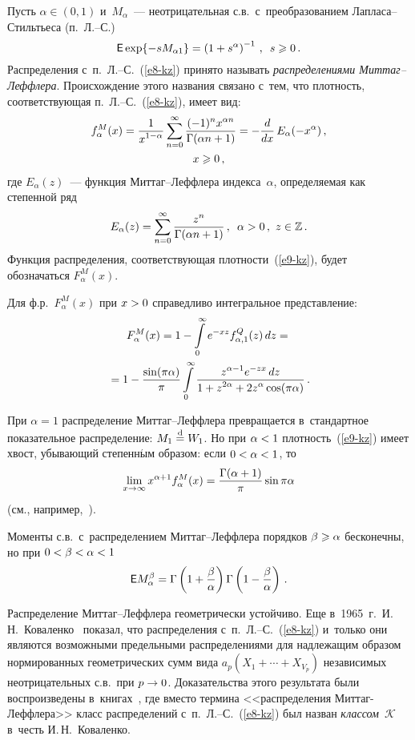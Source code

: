 \begin{multicols}{2}
Пусть $\alpha\in(0,1)$ и~$M_{\alpha}$~--- неотрицательная с.в.\
с~преобразованием Лап\-ла\-са--Стиль\-тье\-са (п.~Л.--С.)
\begin{equation}
{\sf E}\exp\{-sM_{\alpha1}\}=\left(1+s^{\alpha}\right)^{-1}\,,\enskip
s\geqslant0\,.\label{e8-kz}
\end{equation}
Распределения с~п.~Л.--С.~(\ref{e8-kz}) принято называть \textit{распределениями
Мит\-таг--Леф\-фле\-ра}. Происхождение этого названия связано с~тем, что
плотность, соответствующая п.~Л.--С.~(\ref{e8-kz}), имеет вид:
\begin{multline}
f_{\alpha}^{M}(x)=\displaystyle\frac{\displaystyle 1\mathstrut}{\displaystyle x^{1-\alpha}\mathstrut}\sum\limits_{n=0}^{\infty}
\displaystyle\frac{\displaystyle (-1)^nx^{\alpha n}\mathstrut}{\displaystyle \Gamma(\alpha n+1)\mathstrut}=-\displaystyle\frac{\displaystyle d\mathstrut}{\displaystyle dx\mathstrut}\,E_{\alpha}(-x^{\alpha})\,,\\
x\geqslant0\,,\label{e9-kz}
\end{multline}
где $E_{\alpha}(z)$~--- функция Мит\-таг--Леф\-фле\-ра индекса~$\alpha$,
определяемая как степенной ряд
$$
E_{\alpha}(z)=\sum\limits_{n=0}^{\infty}\displaystyle\frac{\displaystyle z^n\mathstrut}{\displaystyle \Gamma(\alpha
n+1)\mathstrut}\,,\enskip \alpha>0\,,\ z\in\mathbb{Z}\,.
$$
Функция распределения, соответствующая плотности~(\ref{e9-kz}), будет обозначаться
$F_{\alpha}^{M}(x)$.

Для ф.р.~$F_{\alpha}^{M}(x)$ при $x\hm>0$ справедливо интегральное
представление:
\begin{multline}
F_{\alpha}^{M}(x)=1-\int\limits_{0}^{\infty}e^{-xz}f_{\alpha,1}^{Q}(z)\,dz={}\\
{}=
1-\displaystyle\frac{\displaystyle \sin(\pi\alpha)\mathstrut}{\displaystyle \pi\mathstrut}\int\limits_{0}^{\infty}
\displaystyle\frac{\displaystyle z^{\alpha-1}e^{-zx}\,dz\mathstrut}{\displaystyle 1+z^{2\alpha}+2z^{\alpha}\cos(\pi\alpha)\mathstrut}\,.
\label{e10-kz}
\end{multline}

При $\alpha=1$ распределение Мит\-таг--Леф\-фле\-ра превращается 
в~стандартное показательное распределение: $M_1\stackrel{\mathrm{d}}{=} W_1$. Но при
$\alpha\hm<1$ плотность~(\ref{e9-kz}) имеет хвост, убывающий степенн$\acute{\mbox{ы}}$м
образом: если $0\hm<\alpha\hm<1$, то
$$
\lim\limits_{x\to\infty}x^{\alpha+1}f_\alpha^{M}(x)=
\displaystyle\frac{\displaystyle \Gamma(\alpha+1)\mathstrut}{\displaystyle \pi\mathstrut}\sin\pi\alpha
$$
(см., например,~\cite{Kilbas2014}).

Моменты с.в.\ с~распределением Мит\-таг--Леф\-фле\-ра порядков
$\beta\hm\geqslant\alpha$ бесконечны, но при $0\hm<\beta\hm<\alpha\hm<1$
$$
{\sf E}M_{\alpha}^{\beta}=
\Gamma\left(1+\displaystyle\frac{\displaystyle \beta\mathstrut}{\displaystyle \alpha\mathstrut}\right)\Gamma\left(1-\displaystyle\frac{\displaystyle \beta\mathstrut}{\displaystyle \alpha\mathstrut}\right)\,.
$$

Распределение Мит\-таг--Леф\-фле\-ра геометрически устойчиво. Еще в~1965~г.\
И.\,Н.~Коваленко~\cite{Kovalenko1965} показал, что распределения с~п.~Л.--С.~(\ref{e8-kz}) 
и~только они являются возможными предельными
распределениями для надлежащим образом нормированных геометрических
сумм вида $a_p(X_1+\cdots+X_{V_p})$ независимых
неотрицательных с.в.\ при $p\hm\to0$. Доказательства этого результата
были воспроизведены в~книгах~\cite{GnedenkoKorolev1996, GnedenkoKovalenko1968,
GnedenkoKovalenko1989}, где вместо
термина <<распределения Мит\-таг-Леф\-фле\-ра>> класс распределений 
с~п.~Л.--С.~(\ref{e8-kz}) был назван \textit{классом}~$\mathcal{K}$ в~честь И.\,Н.~Коваленко.


\end{multicols}
